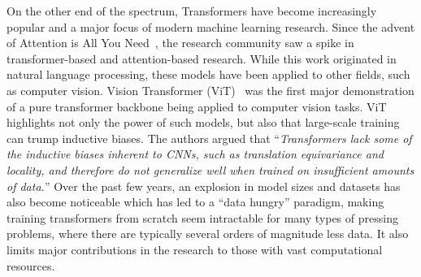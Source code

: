 \documentclass[10pt,twocolumn,letterpaper]{article}
\begin{document}
On the other end of the spectrum, Transformers have become increasingly popular and a major focus of modern machine learning research. Since the advent of Attention is All You Need~\cite{vaswani2017attention}, the research community saw a spike in transformer-based and attention-based research. While this work originated in natural language processing, these models have been applied to other fields, such as computer vision.
Vision Transformer (ViT)~\cite{dosovitskiy2020image} was the first major demonstration of a pure transformer backbone being applied to computer vision tasks.
ViT highlights not only the power of such models, but also that large-scale training can trump inductive biases. The authors argued that ``\textit{Transformers lack some of the inductive biases inherent to CNNs, such as translation equivariance and locality, and therefore do not generalize well when trained on insufficient amounts of data.}''
Over the past few years, an explosion in model sizes and datasets has also become noticeable which has led to a ``data hungry'' paradigm, making training transformers from scratch seem intractable for many types of pressing problems, where there are typically several orders of magnitude less data. It also limits major contributions in the research to those with vast computational resources.
\end{document}
